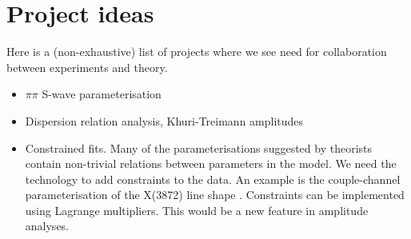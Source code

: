 \section{Project ideas}
Here is a (non-exhaustive) list of projects where we see need for collaboration between experiments and theory.
\begin{itemize}
\item $\pi\pi$ S-wave parameterisation
\item Dispersion relation analysis, Khuri-Treimann amplitudes
\item Constrained fits. Many of the parameterisations suggested by theorists contain non-trivial relations between parameters in the model. We need the technology to add constraints to the data. An example is the couple-channel parameterisation of the X(3872) line shape \cite{Hanhart_2007}. Constraints can be implemented using Lagrange multipliers. This would be a new feature in amplitude analyses.
\end{itemize}